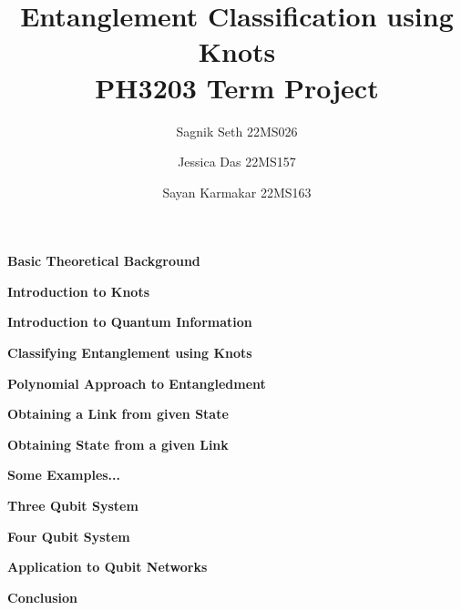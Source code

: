\documentclass{beamer}
\title[Entanglement using Knots]{\huge Entanglement Classification using Knots \\{\large PH3203 Term Project}}
\author[Seth, Das, Karmakar]{{ Sagnik Seth} {\tiny{22MS026}} \and { Jessica  Das}  {\tiny{22MS157}} \and { Sayan Karmakar}  {\tiny{22MS163}}}
\date{}
\begin{document}
	
	\frame{\titlepage}
	
	
	\begin{frame}
		\begin{center}
			\textbf{\huge Basic Theoretical Background}
		\end{center}
	\end{frame}
	\begin{frame}{\textbf{\large Introduction to Knots}}
		
	\end{frame}
	\begin{frame}{\textbf{\large Introduction to Quantum Information}}
		
	\end{frame}
	\begin{frame}
		\begin{center}
			\textbf{\huge Classifying Entanglement using Knots}
		\end{center}
	\end{frame}
	\begin{frame}{\textbf{\large Polynomial Approach to Entangledment}}
		
	\end{frame}
	\begin{frame}{\textbf{Obtaining a Link from given State}}
		
	\end{frame}
	\begin{frame}{\textbf{Obtaining State from a given Link}}
		
	\end{frame}
	\begin{frame}
		\begin{center}
			\textbf{\Huge Some Examples...}
		\end{center}
	\end{frame}
	\begin{frame}{\textbf{Three Qubit System}}
		
	\end{frame}
	\begin{frame}{\textbf{Four Qubit System}}
		
	\end{frame}
	\begin{frame}{\textbf{Application to Qubit Networks}}
		
	\end{frame}
	
	\begin{frame}{\textbf{Conclusion}}
		
	\end{frame}
\end{document}
